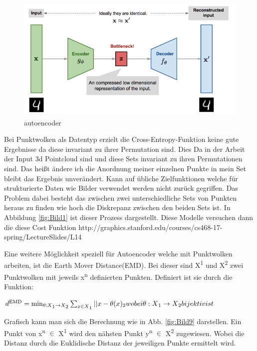 \documentclass{llncs}
\begin{document}
\begin{figure}[htbp] 
	\centering
	\includegraphics[width=1.0\textwidth]{autoencoder.png}
	\caption{autoencoder}
	\label{fig:Bild8}
\end{figure}
Bei Punktwolken als Datentyp erzielt die Cross-Entropy-Funktion keine gute Ergebnisse da diese invariant zu ihrer Permutation sind. Dies Da in der Arbeit der Input 3d Pointcloud sind und diese Sets  invariant zu ihren Permutationen sind\cite{3dgan}. Das heißt ändere ich die Anordnung meiner einzelnen Punkte in mein Set bleibt das Ergebnis unverändert.  Kann auf übliche Zielfunktionen welche für strukturierte Daten wie Bilder verwendet werden nicht zurück gegriffen. Das Problem dabei besteht das zwischen zwei unterschiedliche Sets von Punkten heraus zu finden wie hoch die Diskrepanz zwischen den beiden Sets ist. In Abbildung \ref{fig:Bild1} ist dieser Prozess dargestellt. Diese Modelle versuchen dann die diese Cost Funktion 
 http://graphics.stanford.edu/courses/cs468-17-spring/LectureSlides/L14%


Eine weitere Möglichkeit speziell für Autoencoder welche mit Punktwolken arbeiten, ist die Earth Mover Distance(EMD). Bei dieser sind X\textsuperscript{1} und X\textsuperscript{2} zwei Punktwolken mit jeweils x\textsuperscript{n} definierten Punkten\cite{autoencoderloss}. Definiert ist sie durch die Funktion:

\begin{math}
d\textsuperscript{EMD}=\min_{\theta : X\textsubscript{1}\rightarrow X\textsubscript{2}}  \sum_{x\in X\textsubscript{1}} || x - \theta(x)\textsubscript{2} wobei \theta: X\textsubscript{1} \rightarrow X\textsubscript{2} bijektiv ist 
\end{math}

Grafisch kann man sich die Berechnung wie in Abb. \ref{fig:Bild9} darstellen. Ein Punkt von x\textsuperscript{n} $\in$ X\textsuperscript{1} wird den nähsten Punkt y\textsuperscript{n} $\in$  X\textsuperscript{2} zugewiesen. Wobei die Distanz durch die Euklidische Distanz der jeweiligen Punkte ermittelt wird.
 
\end{document}
